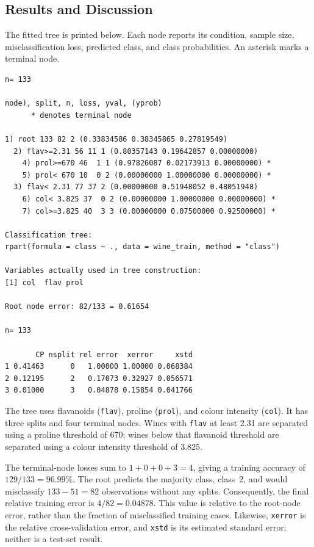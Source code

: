 \documentclass[11pt,a4paper]{article}
\begin{document}
\subsection{Results and Discussion}
The fitted tree is printed below. Each node reports its condition, sample size, misclassification loss, predicted class, and class probabilities. An asterisk marks a terminal node.
\par\noindent\begin{minipage}{\linewidth}
  \begin{lstlisting}[style=console]
n= 133 

node), split, n, loss, yval, (yprob)
      * denotes terminal node

1) root 133 82 2 (0.33834586 0.38345865 0.27819549)  
  2) flav>=2.31 56 11 1 (0.80357143 0.19642857 0.00000000)  
    4) prol>=670 46  1 1 (0.97826087 0.02173913 0.00000000) *
    5) prol< 670 10  0 2 (0.00000000 1.00000000 0.00000000) *
  3) flav< 2.31 77 37 2 (0.00000000 0.51948052 0.48051948)  
    6) col< 3.825 37  0 2 (0.00000000 1.00000000 0.00000000) *
    7) col>=3.825 40  3 3 (0.00000000 0.07500000 0.92500000) *

Classification tree:
rpart(formula = class ~ ., data = wine_train, method = "class")

Variables actually used in tree construction:
[1] col  flav prol

Root node error: 82/133 = 0.61654

n= 133 

       CP nsplit rel error  xerror     xstd
1 0.41463      0   1.00000 1.00000 0.068384
2 0.12195      2   0.17073 0.32927 0.056571
3 0.01000      3   0.04878 0.15854 0.041766
\end{lstlisting}
\end{minipage}\par

The tree uses flavanoids (\texttt{flav}), proline (\texttt{prol}), and colour intensity (\texttt{col}). It has three splits and four terminal nodes. Wines with \texttt{flav} at least 2.31 are separated using a proline threshold of 670; wines below that flavanoid threshold are separated using a colour intensity threshold of 3.825.

The terminal-node losses sum to $1+0+0+3=4$, giving a training accuracy of $129/133=96.99\%$. The root predicts the majority class, class~2, and would misclassify $133-51=82$ observations without any splits. Consequently, the final relative training error is $4/82=0.04878$. This value is relative to the root-node error, rather than the fraction of misclassified training cases. Likewise, \texttt{xerror} is the relative cross-validation error, and \texttt{xstd} is its estimated standard error; neither is a test-set result.
\end{document}
